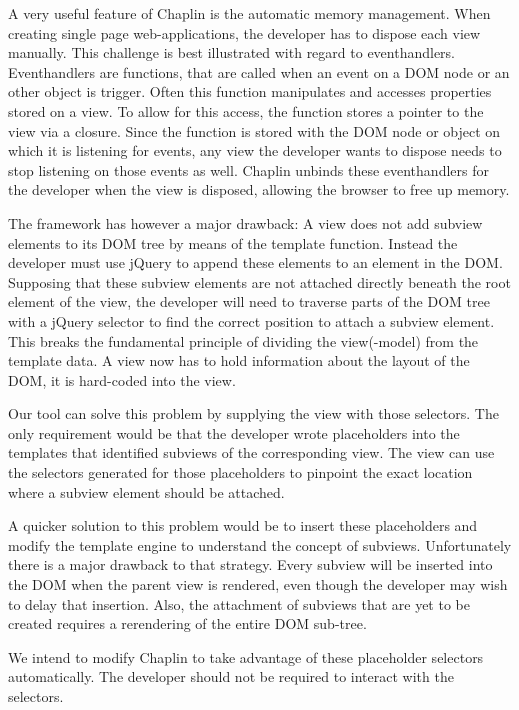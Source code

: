 A very useful feature of Chaplin is the automatic memory management.
When creating single page web-applications, the developer has to dispose each
view manually. This challenge is best illustrated with regard to eventhandlers.
Eventhandlers are functions, that are called when an event on a DOM node or
an other object is trigger. Often this function manipulates and accesses
properties stored on a view. To allow for this access, the function stores a
pointer to the view via a closure. Since the function is stored with the
DOM node or object on which it is listening for events, any view the developer
wants to dispose needs to stop listening on those events as well.
Chaplin unbinds these eventhandlers for the developer when the view is disposed,
allowing the browser to free up memory.

The framework has however a major drawback: A view does not add subview elements
to its DOM tree by means of the template function. Instead the developer
must use jQuery to append these elements to an element in the DOM.
Supposing that these subview elements are not attached directly beneath the root
element of the view, the developer will need to traverse parts of the DOM tree
with a jQuery selector to find the correct position to attach a subview element.
This breaks the fundamental principle of dividing the view(-model) from the
template data. A view now has to hold information about the layout of the DOM,
it is hard-coded into the view.

Our tool can solve this problem by supplying the view with those selectors.
The only requirement would be that the developer wrote placeholders into the
templates that identified subviews of the corresponding view.
The view can use the selectors generated for those placeholders
to pinpoint the exact location where a subview element should be attached.

A quicker solution to this problem would be to insert these placeholders and
modify the template engine to understand the concept of subviews.
Unfortunately there is a major drawback to that strategy.
Every subview will be inserted into the DOM when the parent view is rendered,
even though the developer may wish to delay that insertion.
Also, the attachment of subviews that are yet to be created requires a
rerendering of the entire DOM sub-tree.

We intend to modify Chaplin to take advantage of these placeholder selectors
automatically. The developer should not be required to interact with the
selectors.

